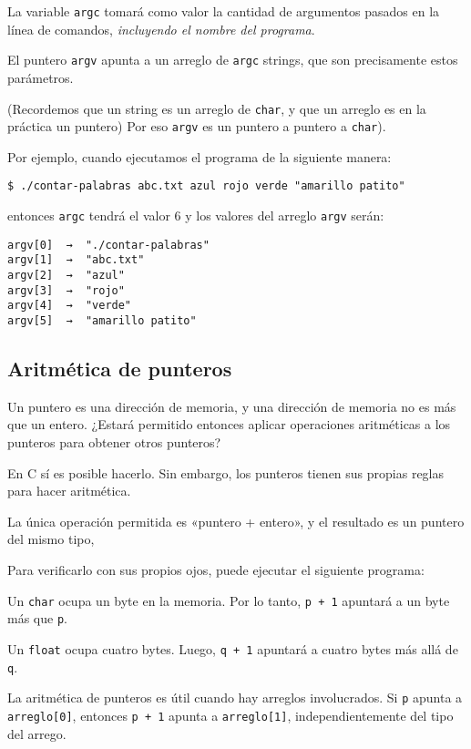 La variable \lstinline!argc! tomará como valor la cantidad de argumentos
pasados en la línea de comandos, \emph{incluyendo el nombre del
programa}.

El puntero \lstinline!argv! apunta a un arreglo de \lstinline!argc!
strings, que son precisamente estos parámetros.

(Recordemos que un string es un arreglo de \lstinline!char!, y que un
arreglo es en la práctica un puntero) Por eso \lstinline!argv! es un
puntero a puntero a \lstinline!char!).

Por ejemplo, cuando ejecutamos el programa de la siguiente manera:

\begin{lstlisting}
$ ./contar-palabras abc.txt azul rojo verde "amarillo patito"
\end{lstlisting}

entonces \lstinline!argc! tendrá el valor 6 y los valores del arreglo
\lstinline!argv! serán:

\begin{verbatim}
argv[0]  →  "./contar-palabras"
argv[1]  →  "abc.txt"
argv[2]  →  "azul"
argv[3]  →  "rojo"
argv[4]  →  "verde"
argv[5]  →  "amarillo patito"
\end{verbatim}

\subsection{Aritmética de punteros}

Un puntero es una dirección de memoria, y una dirección de memoria no es
más que un entero. ¿Estará permitido entonces aplicar operaciones
aritméticas a los punteros para obtener otros punteros?

En C sí es posible hacerlo. Sin embargo, los punteros tienen sus propias
reglas para hacer aritmética.

La única operación permitida es «puntero + entero», y el resultado es un
puntero del mismo tipo,

Para verificarlo con sus propios ojos, puede ejecutar el siguiente
programa:

Un \lstinline!char! ocupa un byte en la memoria. Por lo tanto,
\lstinline!p + 1! apuntará a un byte más que \lstinline!p!.

Un \lstinline!float! ocupa cuatro bytes. Luego, \lstinline!q + 1!
apuntará a cuatro bytes más allá de \lstinline!q!.

La aritmética de punteros es útil cuando hay arreglos involucrados. Si
\lstinline!p! apunta a \lstinline!arreglo[0]!, entonces
\lstinline!p + 1! apunta a \lstinline!arreglo[1]!, independientemente
del tipo del arrego.


